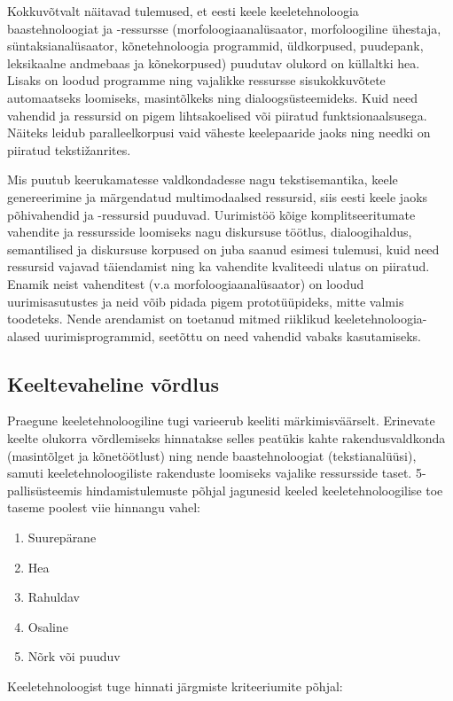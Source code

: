 \documentclass[]{../metanetpaper}
\begin{document}
\begin{multicols}{2}
Kokkuvõtvalt näitavad tulemused, et eesti keele keeletehnoloogia baastehnoloogiat ja -ressursse (morfoloogiaanalüsaator, morfoloogiline ühestaja, süntaksianalüsaator, kõnetehnoloogia programmid, üldkorpused, puudepank, leksikaalne andmebaas ja kõnekorpused) puudutav olukord on küllaltki hea. 
Lisaks on loodud programme ning vajalikke ressursse sisukokkuvõtete automaatseks loomiseks, masintõlkeks ning dialoogsüsteemideks. 
Kuid need vahendid ja ressursid on pigem lihtsakoelised või piiratud funktsionaalsusega. 
Näiteks leidub paralleelkorpusi vaid väheste keelepaaride jaoks ning needki on piiratud tekstižanrites. 

Mis puutub keerukamatesse valdkondadesse nagu tekstisemantika, keele genereerimine ja märgendatud multimodaalsed ressursid, siis eesti keele jaoks põhivahendid ja -ressursid puuduvad. 
Uurimistöö kõige komplitseeritumate vahendite ja ressursside loomiseks nagu diskursuse töötlus, dialoogihaldus, semantilised ja diskursuse korpused on juba saanud esimesi tulemusi, kuid need ressursid vajavad täiendamist ning ka vahendite kvaliteedi ulatus on piiratud. 
Enamik neist vahenditest (v.a morfoloogiaanalüsaator) on loodud uurimisasutustes ja neid võib pidada pigem prototüüpideks, mitte valmis toodeteks. 
Nende arendamist on toetanud mitmed riiklikud keeletehnoloogia-alased uurimisprogrammid, seetõttu on need vahendid vabaks kasutamiseks. 


\subsection{Keeltevaheline võrdlus}

Praegune keeletehnoloogiline tugi varieerub keeliti märkimisväärselt. 
Erinevate keelte olukorra võrdlemiseks hinnatakse selles peatükis kahte rakendusvaldkonda (masintõlget ja kõnetöötlust) ning nende baastehnoloogiat (tekstianalüüsi), samuti keeletehnoloogiliste rakenduste loomiseks vajalike ressursside taset. 5-pallisüsteemis hindamistulemuste põhjal jagunesid keeled keeletehnoloogilise toe taseme poolest viie hinnangu vahel:

\begin{enumerate}
\item Suurepärane
\item Hea
\item Rahuldav
\item Osaline
\item Nõrk või puuduv
\end{enumerate}

Keeletehnoloogist tuge hinnati järgmiste kriteeriumite põhjal:


\end{multicols}
\end{document}
